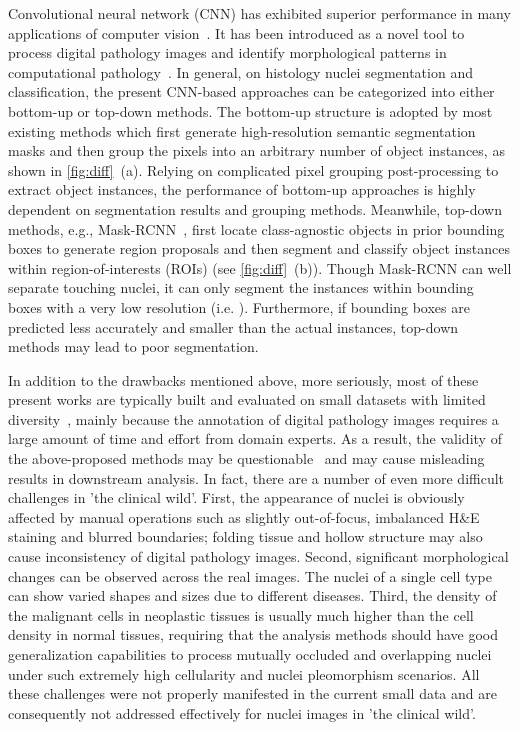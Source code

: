 \documentclass[lettersize,journal]{IEEEtran}
\begin{document}
Convolutional neural network (CNN) has exhibited superior performance in many applications of computer vision~\cite{ETCI1,ETCI2}. It has been introduced as a novel tool to process digital pathology images and identify morphological patterns in computational pathology~\cite{bera2019artificial,song2018contour,liu2021panoptic}. In general, on histology nuclei segmentation and classification, the present CNN-based approaches can be categorized into either bottom-up or top-down methods. The bottom-up structure is adopted by most existing methods \cite{kumar,dist,hovernet,cianet,tripleunet} which first generate high-resolution semantic segmentation masks and then group the pixels into an arbitrary number of object instances, as shown in \autoref{fig:diff}~(a). Relying on complicated pixel grouping post-processing to extract object instances, the performance of bottom-up approaches is highly dependent on segmentation results and grouping methods. Meanwhile, top-down methods, e.g., Mask-RCNN~\cite{maskrcnn}, first locate class-agnostic objects in prior bounding boxes to generate region proposals and then segment and classify object instances within region-of-interests (ROIs) (see \autoref{fig:diff}~(b)). Though Mask-RCNN can well separate touching nuclei, it can only segment the instances within bounding boxes with a very low resolution (i.e. ). Furthermore, if bounding boxes are predicted less accurately and smaller than the actual instances, top-down methods may lead to poor segmentation. 

In addition to the drawbacks mentioned above, more seriously, most of these present works are typically built and evaluated on small datasets with limited diversity~\cite{kumar,hovernet}, mainly because the annotation of digital pathology images requires a large amount of time and effort from domain experts. 
As a result, the validity of the above-proposed methods may be  questionable~\cite{quest} and may cause misleading results in downstream analysis. In fact, there are a number of even more difficult challenges in 'the clinical wild'. First, the appearance of nuclei is obviously affected by manual operations such as slightly out-of-focus, imbalanced H\&E staining and blurred boundaries; folding tissue and hollow structure may also cause inconsistency of digital pathology images. Second, significant morphological changes can be observed across the real images. The nuclei of a single cell type can show varied shapes and sizes due to different diseases. Third, the density of the malignant cells in neoplastic tissues is usually much higher than the cell density in normal tissues, requiring that the analysis methods should have good generalization capabilities to process mutually occluded and overlapping nuclei under such extremely high cellularity and nuclei pleomorphism scenarios. All these challenges were not properly manifested in the current small data and are consequently not addressed effectively for nuclei images in 'the clinical wild'.
\end{document}
